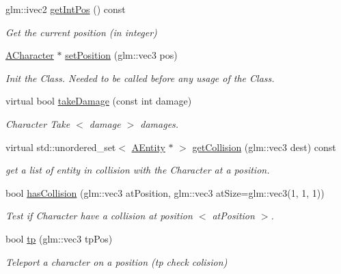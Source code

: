\begin{DoxyCompactItemize}
glm\+::ivec2 \hyperlink{class_a_character_aa7562af195e3615c1f90488799687d9c}{get\+Int\+Pos} () const
\begin{DoxyCompactList}\small\item\em Get the current position (in integer) \end{DoxyCompactList}\item 
\hyperlink{class_a_character}{A\+Character} $\ast$ \hyperlink{class_a_character_a7e110857fc1e545a907d1e083431044a}{set\+Position} (glm\+::vec3 pos)
\begin{DoxyCompactList}\small\item\em Init the Class. Needed to be called before any usage of the Class. \end{DoxyCompactList}\item 
virtual bool \hyperlink{class_a_character_a1ab94580e4db621f79f0bf1d6bcdb600}{take\+Damage} (const int damage)
\begin{DoxyCompactList}\small\item\em Character Take $<$ damage $>$ damages. \end{DoxyCompactList}\item 
virtual std\+::unordered\+\_\+set$<$ \hyperlink{class_a_entity}{A\+Entity} $\ast$ $>$ \hyperlink{class_a_character_a39c7111c4b096129d040e22e3b09592d}{get\+Collision} (glm\+::vec3 dest) const
\begin{DoxyCompactList}\small\item\em get a list of entity in collision with the Character at a position. \end{DoxyCompactList}\item 
bool \hyperlink{class_a_character_abf19d9677b90cd53bd3191b37939137d}{has\+Collision} (glm\+::vec3 at\+Position, glm\+::vec3 at\+Size=glm\+::vec3(1, 1, 1))
\begin{DoxyCompactList}\small\item\em Test if Character have a collision at position $<$ at\+Position $>$. \end{DoxyCompactList}\item 
bool \hyperlink{class_a_character_a295783a792eedc09bcd68bc98eacb6d5}{tp} (glm\+::vec3 tp\+Pos)
\begin{DoxyCompactList}\small\item\em Teleport a character on a position (tp check colision) \end{DoxyCompactList}\end{DoxyCompactItemize}
